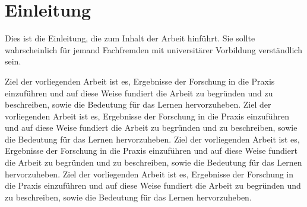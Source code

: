 \chapter{Einleitung}

Dies ist die Einleitung, die zum Inhalt der Arbeit hinführt.
Sie sollte wahrscheinlich für jemand Fachfremden mit universitärer Vorbildung verständlich sein.

Ziel der vorliegenden Arbeit ist es, Ergebnisse der Forschung in die Praxis einzuführen und auf diese Weise fundiert die Arbeit zu begründen und zu beschreiben, sowie die Bedeutung für das Lernen hervorzuheben.
Ziel der vorliegenden Arbeit ist es, Ergebnisse der Forschung in die Praxis einzuführen und auf diese Weise fundiert die Arbeit zu begründen und zu beschreiben, sowie die Bedeutung für das Lernen hervorzuheben.
Ziel der vorliegenden Arbeit ist es, Ergebnisse der Forschung in die Praxis einzuführen und auf diese Weise fundiert die Arbeit zu begründen und zu beschreiben, sowie die Bedeutung für das Lernen hervorzuheben.
Ziel der vorliegenden Arbeit ist es, Ergebnisse der Forschung in die Praxis einzuführen und auf diese Weise fundiert die Arbeit zu begründen und zu beschreiben, sowie die Bedeutung für das Lernen hervorzuheben.

